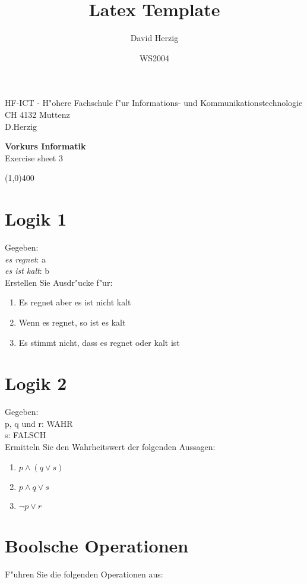 \documentclass[a4paper,10pt]{article}
\title{Latex Template}
\author{David Herzig}
\date{WS2004}
\begin{document}
HF-ICT - H"ohere Fachschule f"ur Informations- und Kommunikationstechnologie\\
CH 4132 Muttenz\\
D.Herzig

\vspace{2mm}

\begin{center}
{\Large \bf Vorkurs Informatik}\\
Exercise sheet 3
\end{center}

\vspace{2mm}

\line(1,0){400}

\vspace{5mm}

\section{Logik 1}
Gegeben:\\
\emph{es regnet}: a\\
\emph{es ist kalt}: b\\
Erstellen Sie Ausdr"ucke f"ur:

\begin{enumerate}
\item Es regnet aber es ist nicht kalt
\item Wenn es regnet, so ist es kalt
\item Es stimmt nicht, dass es regnet oder kalt ist
\end{enumerate}

\section{Logik 2}
Gegeben:\\
p, q und r: WAHR\\
s: FALSCH\\
Ermitteln Sie den Wahrheitswert der folgenden Aussagen:

\begin{enumerate}
\item $p \land (q \lor s)$
\item $p \land q \lor s$
\item $\lnot p \lor r$
\end{enumerate}

\section{Boolsche Operationen}
F"uhren Sie die folgenden Operationen aus:
\end{document}
